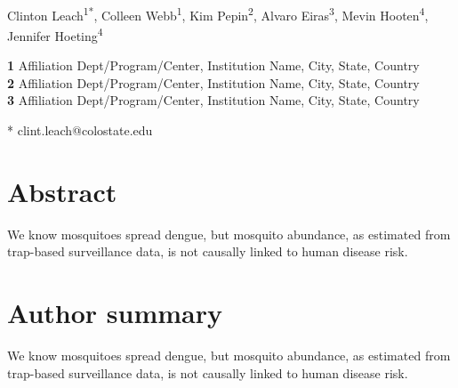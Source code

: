 \documentclass[10pt,letterpaper]{article}
\date{}
\begin{document}
\vspace*{0.2in}

\begin{flushleft}
{\Large
\textbf{}
}
\newline
\\
Clinton Leach\textsuperscript{1*},
Colleen Webb\textsuperscript{1},
Kim Pepin\textsuperscript{2},
Alvaro Eiras\textsuperscript{3},
Mevin Hooten\textsuperscript{4},
Jennifer Hoeting\textsuperscript{4}

\bigskip
\textbf{1} Affiliation Dept/Program/Center, Institution Name, City, State, Country
\\
\textbf{2} Affiliation Dept/Program/Center, Institution Name, City, State, Country
\\
\textbf{3} Affiliation Dept/Program/Center, Institution Name, City, State, Country
\\
\bigskip

% 


* clint.leach@colostate.edu

\end{flushleft}
\section*{Abstract}

We know mosquitoes spread dengue, but mosquito abundance, as estimated from trap-based surveillance data, is not causally linked to human disease risk.

\section*{Author summary}

We know mosquitoes spread dengue, but mosquito abundance, as estimated from trap-based surveillance data, is not causally linked to human disease risk.
\end{document}
